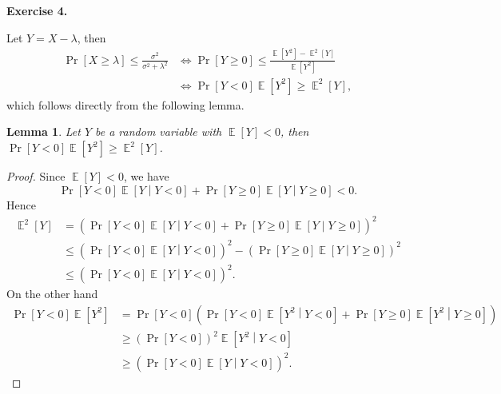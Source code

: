 \documentclass[a4paper]{article}
\newtheorem{lemma}{Lemma}
\newtheorem*{proof}{Proof}
\newenvironment{exercise}[1]{
	\par
	\noindent\textbf{Exercise #1.}\quad
}{
	\par
	\bigskip
}
\DeclareMathOperator{\E}{\mathbb E}
\newcommand{\pbra}[1]{\left( #1 \right)}
\newcommand{\sbra}[1]{\left[ #1 \right]}
\begin{document}
\begin{exercise}{4}
    Let $Y=X-\lambda$, then 
    \begin{align*}
        \Pr\sbra{X\geq\lambda}\leq\frac{\sigma^2}{\sigma^2+\lambda^2}
        &\iff\Pr\sbra{Y\geq0}\leq\frac{\E\sbra{Y^2}-\E^2\sbra{Y}}{\E\sbra{Y^2}}\\
        &\iff\Pr\sbra{Y<0}\E\sbra{Y^2}\geq\E^2\sbra{Y},
    \end{align*}
    which follows directly from the following lemma.
    \begin{lemma}
        Let $Y$ be a random variable with $\E\sbra{Y}<0$, then $\Pr\sbra{Y<0}\E\sbra{Y^2}\geq\E^2\sbra{Y}$.
    \end{lemma}
    \begin{proof}
    Since $\E\sbra{Y}<0$, we have
    $$
    \Pr\sbra{Y<0}\E\sbra{Y\middle|Y<0}+\Pr\sbra{Y\geq0}\E\sbra{Y\middle|Y\geq0}<0.
    $$
    Hence
    \begin{align*}
    \E^2\sbra{Y}
    &=\pbra{\Pr\sbra{Y<0}\E\sbra{Y\middle|Y<0}+\Pr\sbra{Y\geq0}\E\sbra{Y\middle|Y\geq0}}^2\\
        &\leq\pbra{\Pr\sbra{Y<0}\E\sbra{Y\middle|Y<0}}^2-\pbra{\Pr\sbra{Y\geq0}\E\sbra{Y\middle|Y\geq0}}^2\\
        &\leq\pbra{\Pr\sbra{Y<0}\E\sbra{Y\middle|Y<0}}^2.
    \end{align*}
    On the other hand
    \begin{align*}
        \Pr\sbra{Y<0}\E\sbra{Y^2}
        &=\Pr\sbra{Y<0}\pbra{\Pr\sbra{Y<0}\E\sbra{Y^2\middle|Y<0}+\Pr\sbra{Y\geq0}\E\sbra{Y^2\middle|Y\geq0}}\\
        &\geq\pbra{\Pr\sbra{Y<0}}^2\E\sbra{Y^2\middle|Y<0}\\
        &\geq\pbra{\Pr\sbra{Y<0}\E\sbra{Y\middle|Y<0}}^2.
    \end{align*}
    \end{proof}
\end{exercise}
\end{document}
